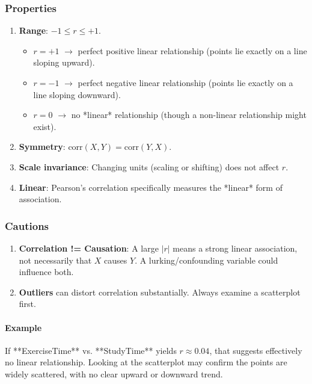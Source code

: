 \documentclass[10pt]{extarticle}
\begin{document}
\subsubsection{Properties}

\begin{enumerate}
    \item \textbf{Range}: $-1 \le r \le +1$.
          \begin{itemize}
              \item $r = +1$ $\rightarrow$ perfect positive linear relationship (points lie exactly on a line sloping upward).
              \item $r = -1$ $\rightarrow$ perfect negative linear relationship (points lie exactly on a line sloping downward).
              \item $r = 0$ $\rightarrow$ no *linear* relationship (though a non-linear relationship might exist).
          \end{itemize}
    \item \textbf{Symmetry}: $\text{corr}(X, Y) = \text{corr}(Y, X)$.
    \item \textbf{Scale invariance}: Changing units (scaling or shifting) does not affect $r$.
    \item \textbf{Linear}: Pearson's correlation specifically measures the *linear* form of association.
\end{enumerate}

\subsubsection{Cautions}

\begin{enumerate}
    \item \textbf{Correlation != Causation}: A large $|r|$ means a strong linear association, not necessarily that $X$ causes $Y$. A lurking/confounding variable could influence both.
    \item \textbf{Outliers} can distort correlation substantially. Always examine a scatterplot first.
\end{enumerate}

\paragraph{Example} If **ExerciseTime** vs. **StudyTime** yields $r \approx 0.04$, that suggests effectively no linear relationship. Looking at the scatterplot may confirm the points are widely scattered, with no clear upward or downward trend.
\end{document}
